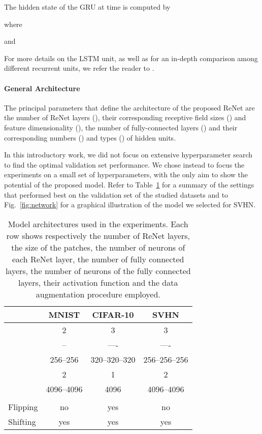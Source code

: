 \documentclass{article} \usepackage{nips15submit_e,times}
\begin{document}
The hidden state of the GRU at time  is computed by

where

and
 

For more details on the LSTM unit, as well as for an in-depth comparison among 
different recurrent units, we refer the reader to \citep{Chung2015}.

\paragraph{General Architecture}

The principal parameters that define the architecture of the proposed ReNet are 
the number of ReNet layers (), their corresponding receptive field 
sizes () and feature dimensionality (), 
the number of fully-connected layers () and their corresponding 
numbers () and types () of hidden units. 

In this introductory work, we did not focus on extensive hyperparameter
search to find the optimal validation set 
performance. We chose instead to focus the experiments on a small set of 
hyperparameters, with the only aim to show the potential of the proposed model.
Refer to Table~\ref{tbl:architectures} for a summary of the settings that performed 
best on the validation set of the studied datasets and to Fig.~\ref{fig:network}
for a graphical illustration of the model we selected for SVHN.



\begin{table}[t]
    \centering
    \begin{tabular}{l || c | c | c }
        & MNIST & CIFAR-10 & SVHN \\
        \hline
        \hline
     & 2 & 3 & 3 \\
        \hline
         & -- & ---- & ---- \\
        \hline
     & 256--256 & 320--320--320 & 256--256--256 \\
        \hline
     & 2 & 1 & 2 \\
        \hline
     & 4096--4096 & 4096 & 4096--4096 \\
        \hline
     &  &  &  \\
        \hline
    Flipping & no & yes & no \\
        \hline
    Shifting & yes & yes & yes \\
    \end{tabular}
    \caption{Model architectures used in the experiments. Each row shows 
             respectively the number of ReNet layers, the size of the patches, 
             the number of neurons of each ReNet layer, the number of fully 
             connected layers, the number of neurons of the fully connected
             layers, their activation function and the data augmentation 
             procedure employed.}
    \label{tbl:architectures}
\end{table}
\end{document}
